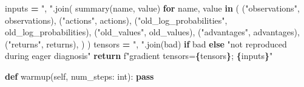 \documentclass[
  american,
  11pt,
  letterpaper,
]{article}
\newenvironment{Shaded}{\begin{snugshade}}{\end{snugshade}}
\newcommand{\BuiltInTok}[1]{#1}
\newcommand{\ControlFlowTok}[1]{\textcolor[rgb]{0.13,0.29,0.53}{\textbf{#1}}}
\newcommand{\KeywordTok}[1]{\textcolor[rgb]{0.13,0.29,0.53}{\textbf{#1}}}
\newcommand{\NormalTok}[1]{#1}
\newcommand{\OperatorTok}[1]{\textcolor[rgb]{0.81,0.36,0.00}{\textbf{#1}}}
\newcommand{\SpecialCharTok}[1]{\textcolor[rgb]{0.81,0.36,0.00}{\textbf{#1}}}
\newcommand{\SpecialStringTok}[1]{\textcolor[rgb]{0.31,0.60,0.02}{#1}}
\newcommand{\StringTok}[1]{\textcolor[rgb]{0.31,0.60,0.02}{#1}}
\newcommand{\VariableTok}[1]{\textcolor[rgb]{0.00,0.00,0.00}{#1}}
\renewenvironment{Shaded}{\par\smallskip}{\par\smallskip}
\begin{document}
\begin{Shaded}
\begin{Highlighting}[]
\NormalTok{        inputs }\OperatorTok{=} \StringTok{", "}\NormalTok{.join(}
\NormalTok{            summary(name, value)}
            \ControlFlowTok{for}\NormalTok{ name, value }\KeywordTok{in}\NormalTok{ (}
\NormalTok{                (}\StringTok{"observations"}\NormalTok{, observations),}
\NormalTok{                (}\StringTok{"actions"}\NormalTok{, actions),}
\NormalTok{                (}\StringTok{"old\_log\_probabilities"}\NormalTok{, old\_log\_probabilities),}
\NormalTok{                (}\StringTok{"old\_values"}\NormalTok{, old\_values),}
\NormalTok{                (}\StringTok{"advantages"}\NormalTok{, advantages),}
\NormalTok{                (}\StringTok{"returns"}\NormalTok{, returns),}
\NormalTok{            )}
\NormalTok{        )}
\NormalTok{        tensors }\OperatorTok{=} \StringTok{", "}\NormalTok{.join(bad) }\ControlFlowTok{if}\NormalTok{ bad }\ControlFlowTok{else} \StringTok{"not reproduced during eager diagnosis"}
        \ControlFlowTok{return} \SpecialStringTok{f"gradient tensors=}\SpecialCharTok{\{}\NormalTok{tensors}\SpecialCharTok{\}}\SpecialStringTok{; }\SpecialCharTok{\{}\NormalTok{inputs}\SpecialCharTok{\}}\SpecialStringTok{"}

    \KeywordTok{def}\NormalTok{ warmup(}\VariableTok{self}\NormalTok{, num\_steps: }\BuiltInTok{int}\NormalTok{):}
        \ControlFlowTok{pass}


\end{Highlighting}
\end{Shaded}
\end{document}
